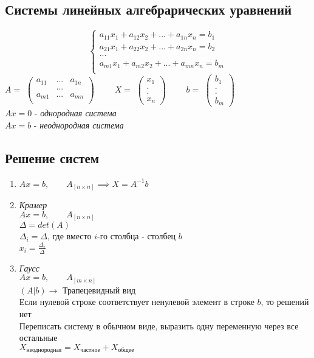 \documentclass[12pt]{article}
\begin{document}
\subsection{Системы линейных алгебрарических уравнений}
\begin{equation*}
	\begin{cases*}
		a_{11}x_1+a_{12}x_2+ ... + a_{1n}x_n=b_1\\
		a_{21}x_1+a_{22}x_2+ ... + a_{2n}x_n=b_2\\
		...\\
		a_{m1}x_1+a_{m2}x_2+ ... + a_{mn}x_n=b_m\\
	\end{cases*}
\end{equation*}
$A = $
\ensuremath{
	\begin{pmatrix}
		a_{11} & ...  & a_{1n}\\
		&...&\\
		a_{m1} & ... & a_{mn}\\
	\end{pmatrix}
}
$\qquad X = $
\ensuremath{
	\begin{pmatrix}
		x_1\\
		.\\
		.\\
		x_n
	\end{pmatrix}
}
$\qquad b =$
\ensuremath{
	\begin{pmatrix}
		b_1\\
		.\\
		.\\
		b_m
	\end{pmatrix}
} \vspace{.4cm}\\
$Ax=0 $ - \emph{однородная система}\\
$Ax=b $ - \emph{неоднородная система}\\
\subsection{Решение систем}

\begin{enumerate}
	\item {
	$Ax=b, \qquad A_{[n \times n]} \implies X = A^{-1}b$	
}
	\item { \textit{Крамер}\\
		$Ax=b,  \qquad A_{[n \times n]}$\\
		$\Delta=det(A)$\\
		$\Delta_{i}=\Delta$, где вместо $i$-го столбца - столбец $b$\\
		$x_i=\frac{\Delta_i}{\Delta}$
}
	\item {\textit{Гаусс}\\
	$Ax=b,  \qquad A_{[m \times n]}$\\
	$(A|b) \rightarrow$ Трапецевидный вид\\
	Если нулевой строке соответствует ненулевой элемент в строке $b$, то решений нет\\
	Переписать систему в обычном виде, выразить одну переменную через все остальные\\
	$X_{\text{неоднородная}}=X_{\text{частное}}+X_{\text{общее}}$
}
\end{enumerate}
\end{document}
